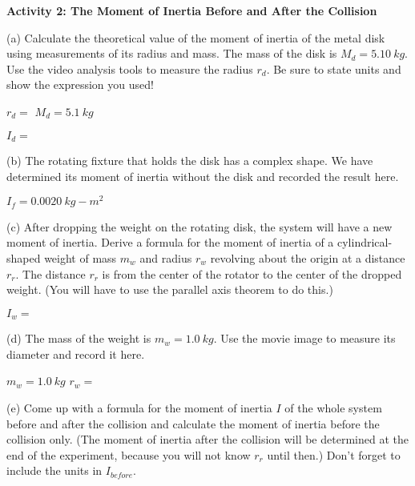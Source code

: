 \textbf{Activity 2: The Moment of Inertia Before and After the Collision}

(a) Calculate the theoretical value of the moment of inertia of the metal disk
using measurements of its radius and mass. The mass of the disk is $M_d = 5.10~kg$. 
Use the video analysis tools to measure the radius $r_d$.
Be sure to state units and
show the expression you used!
\vspace{5mm}

\( r_{d} =\)  \hfill{}\( M_{d}= 5.1~kg\) \hfill{}
\vspace{5mm}

\( I_{d}= \)
\vspace{5mm}

(b) The rotating fixture that holds the disk has a complex shape. 
We have determined its moment of inertia without the disk and recorded the result here. 
\vspace{5mm}

\( I_{f} = 0.0020~kg-m^2\)
\vspace{5mm}

(c) After dropping the weight on the rotating disk, the system will have a new
moment of inertia. Derive a formula for the moment of inertia of a cylindrical-shaped 
weight of mass \( m_{w} \) and radius \( r_{w} \) revolving about the origin at a distance \( r_{r} \). 
The distance $r_r$ is from the center of the rotator to the center of the dropped weight.
(You will have to use the parallel axis theorem to do this.)
\vspace{5mm}

\( I_{w} =\)  
\vspace{5mm}



\parbox{6.5in}{(d) The mass of the weight is $m_w = 1.0 ~kg$. 
Use the movie image to measure its diameter and record it
here.

\vspace{5mm}

\( m_{w} = 1.0~kg\)  \hfill{}\(r_{w} =\) \hfill{}
\vspace{5mm}}

(e) Come up with a formula for the moment of inertia $I$ of the whole system
before and after the collision and calculate the moment of inertia before the
collision only. (The moment of inertia after the collision will be determined at the end of the experiment, 
because you will not know \( r_{r} \) until then.) 
Don't forget to include the units in \( I_{before} \).
\vspace{5mm}

